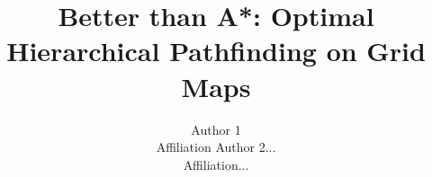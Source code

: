 \documentclass{article}
\begin{document}
\title{Better than A*: Optimal Hierarchical Pathfinding on Grid Maps}
\author{
Author 1\\
Affiliation
\And
Author 2...\\
Affiliation...
}
\maketitle










%





\end{document}
